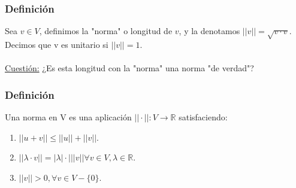 \documentclass[12pt, a4paper, ones, notitlepage, openany,titlepage]{article}
\begin{document}
\subsubsection{Definición}
Sea $v \in V$, definimos la "norma" o longitud de $v$, y la denotamos $||v|| = \sqrt{v \cdot v}$. Decimos que v es unitario si $||v|| = 1$.\\\\
\underline{Cuestión:}
¿Es esta longitud con la "norma" una norma "de verdad"?

\subsubsection{Definición}
Una norma en V es una aplicación $||\cdot|| : V \longrightarrow \mathbb{R}$ satisfaciendo:
\begin{enumerate}
	\item $||u + v || \le ||u|| + ||v||$.
	\item $||\lambda \cdot v|| = |\lambda| \cdot| ||v|| \forall v \in V, \lambda \in \mathbb{R}$.
	\item $||v|| > 0, \forall v \in V - \{0\}$.
\end{enumerate}
\end{document}
